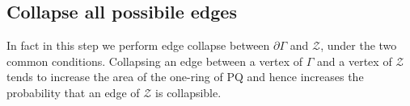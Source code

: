 \documentclass{article}
\theoremstyle{definition}
\theoremstyle{remark}
\begin{document}
\subsection{Collapse all possibile edges}
In fact in this step we perform edge collapse between $\partial \Gamma$ and $\mathcal{Z}$, under the two common conditions. Collapsing an edge between a vertex of $\Gamma$ and a vertex of $\mathcal{Z}$ tends to increase the area of the one-ring of PQ  and hence increases the probability that an edge of $\mathcal{Z}$ is collapsible.
\end{document}
